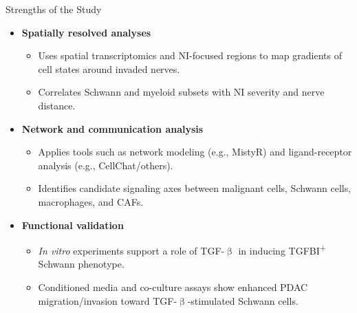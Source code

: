 \documentclass[10pt]{beamer}
\theoremstyle{plain}
\begin{document}
\begin{frame}{Strengths of the Study}
  \begin{itemize}
    \item \textbf{Spatially resolved analyses}
      \begin{itemize}
        \item Uses spatial transcriptomics and NI-focused regions to map gradients of cell states around invaded nerves.
        \item Correlates Schwann and myeloid subsets with NI severity and nerve distance.
      \end{itemize}
    \item \textbf{Network and communication analysis}
      \begin{itemize}
        \item Applies tools such as network modeling (e.g., MistyR) and ligand-receptor analysis (e.g., CellChat/others).
        \item Identifies candidate signaling axes between malignant cells, Schwann cells, macrophages, and CAFs.
      \end{itemize}
    \item \textbf{Functional validation}
      \begin{itemize}
        \item \textit{In vitro} experiments support a role of TGF-\(\upbeta\) in inducing TGFBI\textsuperscript{+} Schwann phenotype.
        \item Conditioned media and co-culture assays show enhanced PDAC migration/invasion toward TGF-\(\upbeta\)-stimulated Schwann cells.
      \end{itemize}
  \end{itemize}
\end{frame}
\end{document}
